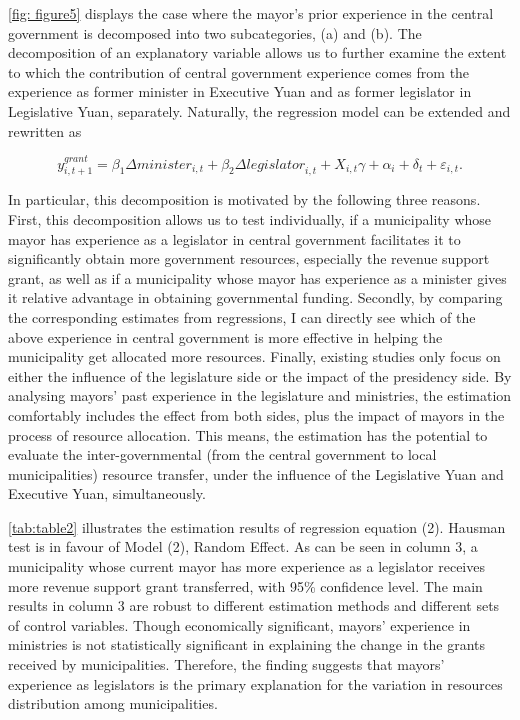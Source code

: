 \autoref{fig: figure5} displays the case where the mayor's prior experience in the central government is decomposed into two subcategories, (a) and (b). The decomposition of an explanatory variable allows us to further examine the extent to which the contribution of central government experience comes from the experience as former minister in Executive Yuan and as former legislator in Legislative Yuan, separately. Naturally, the regression model can be extended and rewritten as 

\begin{equation} \ensuremath{y_{i,t+1}^{grant}}=\ensuremath{\beta_{1}{\Delta minister}_{i,t} + \beta_{2}{\Delta legislator}_{i,t} + X_{i,t}\gamma + \alpha_{i} + \delta_{t} + \varepsilon_{i,t}}.\end{equation}

In particular, this decomposition is motivated by the following three reasons. First, this decomposition allows us to test individually, if a municipality whose mayor has experience as a legislator in central government facilitates it to significantly obtain more government resources, especially the revenue support grant, as well as if a municipality whose mayor has experience as a minister gives it relative advantage in obtaining governmental funding. Secondly, by comparing the corresponding estimates from regressions, I can directly see which of the above experience in central government is more effective in helping the municipality get allocated more resources. Finally, existing studies only focus on either the influence of the legislature side or the impact of the presidency side. By analysing mayors' past experience in the legislature and ministries, the estimation comfortably includes the effect from both sides, plus the impact of mayors in the process of resource allocation. This means, the estimation has the potential to evaluate the inter-governmental (from the central government to local municipalities) resource transfer, under the influence of the Legislative Yuan and Executive Yuan, simultaneously. 

\autoref{tab:table2} illustrates the estimation results of regression equation (2). Hausman test is in favour of Model (2), Random Effect. As can be seen in column 3, a municipality whose current mayor has more experience as a legislator receives more revenue support grant transferred, with 95\% confidence level. The main results in column 3 are robust to different estimation methods and different sets of control variables. Though economically significant, mayors' experience in ministries is not statistically significant in explaining the change in the grants received by municipalities. Therefore, the finding suggests that mayors' experience as legislators is the primary explanation for the variation in resources distribution among municipalities.

